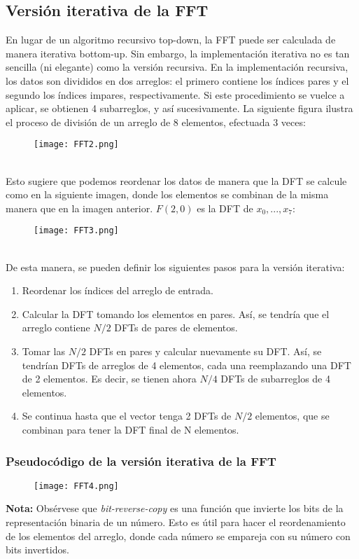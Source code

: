 \documentclass{article}
\begin{document}
\subsection{Versión iterativa de la FFT}
En lugar de un algoritmo recursivo top-down, la FFT puede ser calculada de manera iterativa bottom-up. Sin embargo, la implementación iterativa no es tan sencilla (ni elegante) como la versión recursiva. En la implementación recursiva, los datos son divididos en dos arreglos: el primero contiene los índices pares y el segundo los índices impares, respectivamente. Si este procedimiento se vuelce a aplicar, se obtienen 4 subarreglos, y así sucesivamente. La siguiente figura ilustra el proceso de división de un arreglo de 8 elementos, efectuada 3 veces:
\begin{figure}[h]
\centering
\texttt{[image: FFT2.png]}
\end{figure}\\
Esto sugiere que podemos reordenar los datos de manera que la DFT se calcule como en la siguiente imagen, donde los elementos se combinan de la misma manera que en la imagen anterior. $F(2,0)$ es la DFT de $x_0,...,x_7$: 
\begin{figure}[h]
\centering
\texttt{[image: FFT3.png]}
\end{figure}\\
De esta manera, se pueden definir los siguientes pasos para la versión iterativa:
\begin{enumerate}
    \item Reordenar los índices del arreglo de entrada.
    \item Calcular la DFT tomando los elementos en pares. Así, se tendría que el arreglo contiene $N/2$ DFTs de pares de elementos.
    \item Tomar las $N/2$ DFTs en pares y calcular nuevamente su DFT. Así, se tendrían DFTs de arreglos de 4 elementos, cada una reemplazando una DFT de 2 elementos. Es decir, se tienen ahora $N/4$ DFTs de subarreglos de 4 elementos.
    \item Se continua hasta que el vector tenga 2 DFTs de $N/2$ elementos, que se combinan para tener la DFT final de N elementos.
\end{enumerate}

\subsubsection{Pseudocódigo de la versión iterativa de la FFT}
\begin{figure}[h]
\centering
\texttt{[image: FFT4.png]}
\end{figure}
\textbf{Nota:} Obsérvese que \textit{bit-reverse-copy} es una función que invierte los bits de la representación binaria de un número. Esto es útil para hacer el reordenamiento de los elementos del arreglo, donde cada número se empareja con su número con bits invertidos. 
\end{document}
